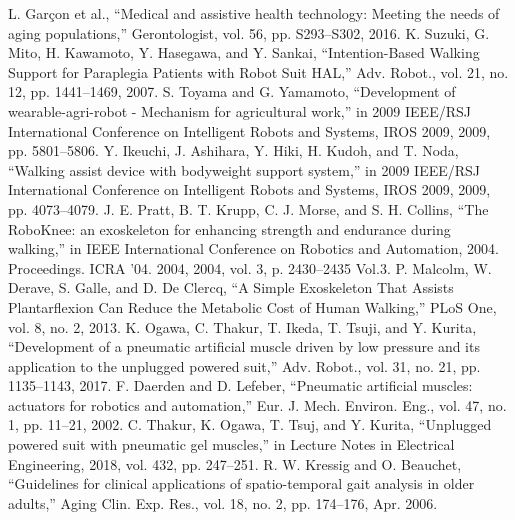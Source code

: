 \documentclass[letterpaper, 10 pt, conference]{ieeeconf}  %
\begin{document}
\begin{thebibliography}{10}

	L. Garçon et al., “Medical and assistive health technology: Meeting the needs of aging populations,” Gerontologist, vol. 56, pp. S293–S302, 2016.
	K. Suzuki, G. Mito, H. Kawamoto, Y. Hasegawa, and Y. Sankai, “Intention-Based Walking Support for Paraplegia Patients with Robot Suit HAL,” Adv. Robot., vol. 21, no. 12, pp. 1441–1469, 2007.
	S. Toyama and G. Yamamoto, “Development of wearable-agri-robot - Mechanism for agricultural work,” in 2009 IEEE/RSJ International Conference on Intelligent Robots and Systems, IROS 2009, 2009, pp. 5801–5806.
	Y. Ikeuchi, J. Ashihara, Y. Hiki, H. Kudoh, and T. Noda, “Walking assist device with bodyweight support system,” in 2009 IEEE/RSJ International Conference on Intelligent Robots and Systems, IROS 2009, 2009, pp. 4073–4079.
	J. E. Pratt, B. T. Krupp, C. J. Morse, and S. H. Collins, “The RoboKnee: an exoskeleton for enhancing strength and endurance during walking,” in IEEE International Conference on Robotics and Automation, 2004. Proceedings. ICRA ’04. 2004, 2004, vol. 3, p. 2430–2435 Vol.3.
	P. Malcolm, W. Derave, S. Galle, and D. De Clercq, “A Simple Exoskeleton That Assists Plantarflexion Can Reduce the Metabolic Cost of Human Walking,” PLoS One, vol. 8, no. 2, 2013.
	K. Ogawa, C. Thakur, T. Ikeda, T. Tsuji, and Y. Kurita, “Development of a pneumatic artificial muscle driven by low pressure and its application to the unplugged powered suit,” Adv. Robot., vol. 31, no. 21, pp. 1135–1143, 2017.
	F. Daerden and D. Lefeber, “Pneumatic artificial muscles: actuators for robotics and automation,” Eur. J. Mech. Environ. Eng., vol. 47, no. 1, pp. 11–21, 2002.
	C. Thakur, K. Ogawa, T. Tsuj, and Y. Kurita, “Unplugged powered suit with pneumatic gel muscles,” in Lecture Notes in Electrical Engineering, 2018, vol. 432, pp. 247–251.
R. W. Kressig and O. Beauchet, “Guidelines for clinical applications of spatio-temporal gait analysis in older adults,” Aging Clin. Exp. Res., vol. 18, no. 2, pp. 174–176, Apr. 2006.


\end{thebibliography}
\end{document}

